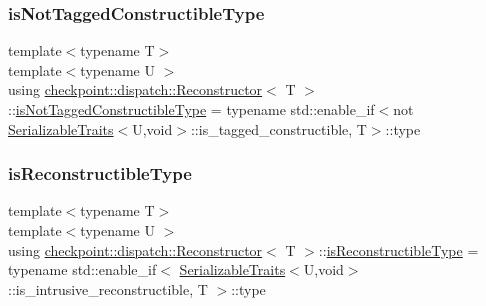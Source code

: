 \mbox{\label{structcheckpoint_1_1dispatch_1_1_reconstructor_ad77b3a3fcf6fe7ed97698d6ca42b16c7}} 
\subsubsection{\texorpdfstring{is\+Not\+Tagged\+Constructible\+Type}{isNotTaggedConstructibleType}}
{\footnotesize\ttfamily template$<$typename T$>$ \\
template$<$typename U $>$ \\
using \hyperlink{structcheckpoint_1_1dispatch_1_1_reconstructor}{checkpoint\+::dispatch\+::\+Reconstructor}$<$ T $>$\+::\hyperlink{structcheckpoint_1_1dispatch_1_1_reconstructor_ad77b3a3fcf6fe7ed97698d6ca42b16c7}{is\+Not\+Tagged\+Constructible\+Type} =  typename std\+::enable\+\_\+if$<$not \hyperlink{structcheckpoint_1_1_serializable_traits}{Serializable\+Traits}$<$U,void$>$\+::is\+\_\+tagged\+\_\+constructible, T$>$\+::type}

\mbox{\label{structcheckpoint_1_1dispatch_1_1_reconstructor_a37f3875f054a494315bf3a577346073d}} 
\subsubsection{\texorpdfstring{is\+Reconstructible\+Type}{isReconstructibleType}}
{\footnotesize\ttfamily template$<$typename T$>$ \\
template$<$typename U $>$ \\
using \hyperlink{structcheckpoint_1_1dispatch_1_1_reconstructor}{checkpoint\+::dispatch\+::\+Reconstructor}$<$ T $>$\+::\hyperlink{structcheckpoint_1_1dispatch_1_1_reconstructor_a37f3875f054a494315bf3a577346073d}{is\+Reconstructible\+Type} =  typename std\+::enable\+\_\+if$<$ \hyperlink{structcheckpoint_1_1_serializable_traits}{Serializable\+Traits}$<$U,void$>$\+::is\+\_\+intrusive\+\_\+reconstructible, T $>$\+::type}

